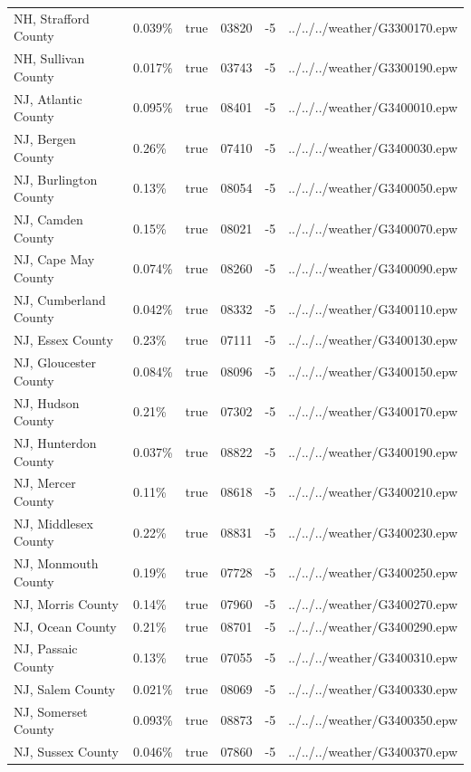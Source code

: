 \begin{longtable}[]{@{}llllll@{}}
NH, Strafford County & 0.039\% & true & 03820 & -5 &
../../../weather/G3300170.epw \\
NH, Sullivan County & 0.017\% & true & 03743 & -5 &
../../../weather/G3300190.epw \\
NJ, Atlantic County & 0.095\% & true & 08401 & -5 &
../../../weather/G3400010.epw \\
NJ, Bergen County & 0.26\% & true & 07410 & -5 &
../../../weather/G3400030.epw \\
NJ, Burlington County & 0.13\% & true & 08054 & -5 &
../../../weather/G3400050.epw \\
NJ, Camden County & 0.15\% & true & 08021 & -5 &
../../../weather/G3400070.epw \\
NJ, Cape May County & 0.074\% & true & 08260 & -5 &
../../../weather/G3400090.epw \\
NJ, Cumberland County & 0.042\% & true & 08332 & -5 &
../../../weather/G3400110.epw \\
NJ, Essex County & 0.23\% & true & 07111 & -5 &
../../../weather/G3400130.epw \\
NJ, Gloucester County & 0.084\% & true & 08096 & -5 &
../../../weather/G3400150.epw \\
NJ, Hudson County & 0.21\% & true & 07302 & -5 &
../../../weather/G3400170.epw \\
NJ, Hunterdon County & 0.037\% & true & 08822 & -5 &
../../../weather/G3400190.epw \\
NJ, Mercer County & 0.11\% & true & 08618 & -5 &
../../../weather/G3400210.epw \\
NJ, Middlesex County & 0.22\% & true & 08831 & -5 &
../../../weather/G3400230.epw \\
NJ, Monmouth County & 0.19\% & true & 07728 & -5 &
../../../weather/G3400250.epw \\
NJ, Morris County & 0.14\% & true & 07960 & -5 &
../../../weather/G3400270.epw \\
NJ, Ocean County & 0.21\% & true & 08701 & -5 &
../../../weather/G3400290.epw \\
NJ, Passaic County & 0.13\% & true & 07055 & -5 &
../../../weather/G3400310.epw \\
NJ, Salem County & 0.021\% & true & 08069 & -5 &
../../../weather/G3400330.epw \\
NJ, Somerset County & 0.093\% & true & 08873 & -5 &
../../../weather/G3400350.epw \\
NJ, Sussex County & 0.046\% & true & 07860 & -5 &
../../../weather/G3400370.epw \\

\end{longtable}
